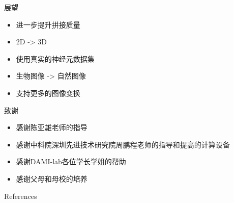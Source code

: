 \documentclass[10pt]{beamer}
\newcommand{\themename}{\textbf{\textsc{metropolis}}\xspace}
\begin{document}
\begin{frame}[fragile]{展望}
  \begin{itemize}
    \item 进一步提升拼接质量
    \item 2D -> 3D
    \item 使用真实的神经元数据集
    \item 生物图像 -> 自然图像
    \item 支持更多的图像变换
  \end{itemize}
\end{frame}

\begin{frame}[fragile]{致谢}
  \begin{itemize}
    \item 感谢陈亚雄老师的指导
    \item 感谢中科院深圳先进技术研究院周鹏程老师的指导和提高的计算设备
    \item 感谢DAMI-lab各位学长学姐的帮助
    \item 感谢父母和母校的培养
  \end{itemize}
\end{frame}

\appendix

\begin{frame}{References}
  
  

\end{frame}







\end{document}
